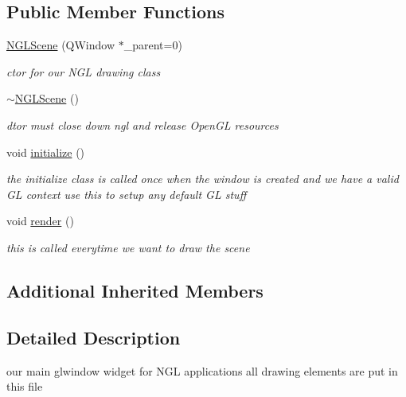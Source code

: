 \subsection*{Public Member Functions}
\begin{DoxyCompactItemize}
\item 
\hyperlink{classNGLScene_adbde5986bed766df177e33baa7fbb222}{N\-G\-L\-Scene} (Q\-Window $\ast$\-\_\-parent=0)
\begin{DoxyCompactList}\small\item\em ctor for our N\-G\-L drawing class \end{DoxyCompactList}\item 
\hypertarget{classNGLScene_abda05d130945833bfbb6bad8d619f7f5}{\hyperlink{classNGLScene_abda05d130945833bfbb6bad8d619f7f5}{$\sim$\-N\-G\-L\-Scene} ()}\label{classNGLScene_abda05d130945833bfbb6bad8d619f7f5}

\begin{DoxyCompactList}\small\item\em dtor must close down ngl and release Open\-G\-L resources \end{DoxyCompactList}\item 
\hypertarget{classNGLScene_a63e57fc201b639e51c6eed6ec3b6b992}{void \hyperlink{classNGLScene_a63e57fc201b639e51c6eed6ec3b6b992}{initialize} ()}\label{classNGLScene_a63e57fc201b639e51c6eed6ec3b6b992}

\begin{DoxyCompactList}\small\item\em the initialize class is called once when the window is created and we have a valid G\-L context use this to setup any default G\-L stuff \end{DoxyCompactList}\item 
\hypertarget{classNGLScene_a63905ed5bab957d8e2d5528f942feb42}{void \hyperlink{classNGLScene_a63905ed5bab957d8e2d5528f942feb42}{render} ()}\label{classNGLScene_a63905ed5bab957d8e2d5528f942feb42}

\begin{DoxyCompactList}\small\item\em this is called everytime we want to draw the scene \end{DoxyCompactList}\end{DoxyCompactItemize}
\subsection*{Additional Inherited Members}


\subsection{Detailed Description}
our main glwindow widget for N\-G\-L applications all drawing elements are put in this file 

